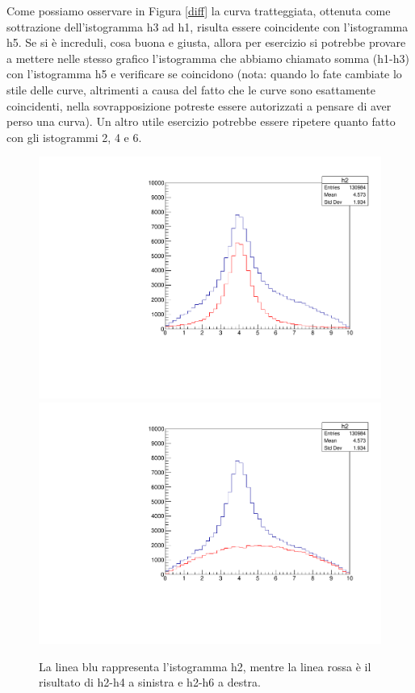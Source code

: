 \documentclass[11pt,fleqn]{book} %
\begin{document}
Come possiamo osservare in Figura \ref{diff} la curva tratteggiata, ottenuta come sottrazione dell'istogramma h3 ad h1, risulta essere coincidente con l'istogramma h5. Se si è increduli, cosa buona e giusta, allora per esercizio si potrebbe provare a mettere nelle stesso grafico l'istogramma che abbiamo chiamato somma (h1-h3) con l'istogramma h5 e verificare se coincidono (nota: quando lo fate cambiate lo stile delle curve, altrimenti a causa del fatto che le curve sono esattamente coincidenti, nella sovrapposizione potreste essere autorizzati a pensare di aver perso una curva).
Un altro utile esercizio potrebbe essere ripetere quanto fatto con gli istogrammi 2, 4 e 6.

\begin{figure}[h]
\centering
\includegraphics[scale=0.35]{Pictures/diff3.pdf}
\includegraphics[scale=0.35]{Pictures/diff4.pdf}
\caption{La linea blu rappresenta l'istogramma h2, mentre la linea rossa è il risultato di h2-h4 a sinistra e h2-h6 a destra.   \label{diff2}}
\end{figure}
\end{document}
